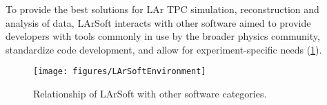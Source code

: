
%
%
%

To provide the best solutions for LAr TPC simulation, reconstruction and
analysis of data, LArSoft interacts with other software aimed to
provide developers with tools commonly in use by the broader physics community,
standardize code development,
and allow for experiment-specific needs (\cref{fig:LArSoftRelations}).
\begin{figure}
	\centering
	\texttt{[image: figures/LArSoftEnvironment]}
	\caption{\label{fig:LArSoftRelations}
		Relationship of LArSoft with other software categories.
	}
\end{figure}

